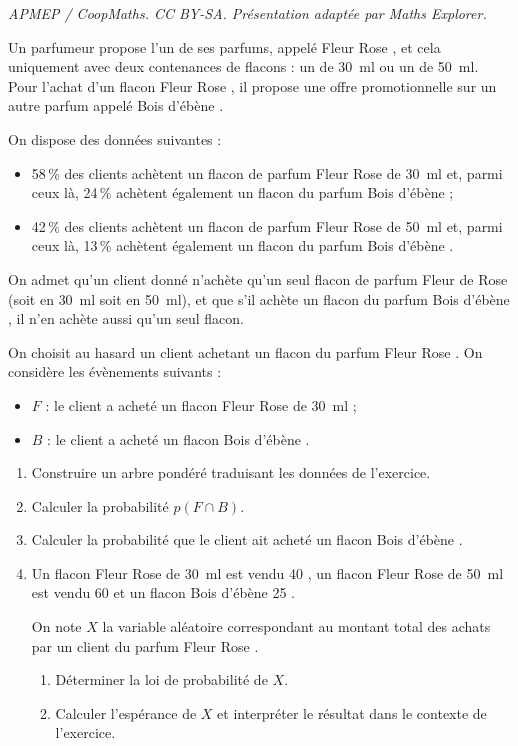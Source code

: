 \documentclass[10pt]{article}
\providecommand{\euro}{\texteuro}
\providecommand{\np}[2][]{{#2~#1}}
\providecommand{\euro}{{\text{€}}}
\renewcommand{\euro}{\ifmmode\text{\texteuro}\else\texteuro\fi}
\begin{document}
\noindent\textit{APMEP / CoopMaths. CC BY-SA. Présentation adaptée par Maths Explorer.}\par\medskip
\medskip

Un parfumeur propose l'un de ses parfums, appelé \og Fleur Rose \fg, et cela uniquement avec
deux contenances de flacons : un de \np[ml]{30}  ou un de \np[ml]{50}. Pour l'achat d'un flacon \og Fleur Rose \fg, il propose une offre promotionnelle sur un autre parfum appelé \og Bois d'ébène \fg.

On dispose des données suivantes :

\begin{itemize}
\item 58\,\% des clients achètent un flacon de parfum \og Fleur Rose \fg{} de \np[ml]{30} et, parmi ceux là, 24\,\% achètent également un flacon du parfum \og Bois d'ébène \fg ;
\item 42\,\% des clients achètent un flacon de parfum \og Fleur Rose \fg{} de \np[ml]{50}  et, parmi ceux là,
13\,\% achètent également un flacon du parfum \og Bois d'ébène \fg.
\end{itemize}

On admet qu'un client donné n'achète qu'un seul flacon de parfum \og Fleur de Rose \fg{} (soit en
\np[ml]{30} soit en \np[ml]{50}), et que s'il achète un flacon du parfum \og Bois d'ébène \fg, il n'en achète
aussi qu'un seul flacon.

On choisit au hasard un client achetant un flacon du parfum \og Fleur Rose \fg. On considère les
évènements suivants :
\begin{itemize}
\item $F$ : \og le client a acheté un flacon \og Fleur Rose \fg{} de \np[ml]{30} \fg ;
\item $B$ : \og le client a acheté un flacon \og Bois d'ébène \fg.
\end{itemize}

\medskip

\begin{enumerate}
\item Construire un arbre pondéré traduisant les données de l'exercice.
\item Calculer la probabilité $p(F \cap B)$.
\item Calculer la probabilité que le client ait acheté un flacon \og Bois d'ébène \fg.
\item Un flacon \og Fleur Rose \fg{} de \np[ml]{30} est vendu 40 \euro, un flacon \og Fleur Rose \fg{} de \np[ml]{50} est vendu 60 \euro{} et un flacon \og Bois d'ébène \fg{} 25 \euro.

On note $X$ la variable aléatoire correspondant
au montant total des achats par un client du parfum \og Fleur Rose \fg.
	\begin{enumerate}
		\item  Déterminer la loi de probabilité de $X$.
		\item Calculer l'espérance de $X$ et interpréter le résultat dans le contexte de l'exercice.
	\end{enumerate}
\end{enumerate}

\vspace{0,5cm}
\end{document}
